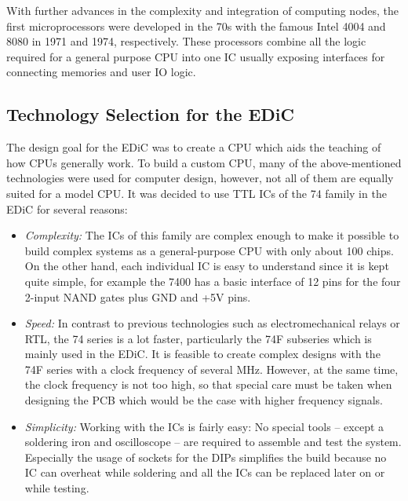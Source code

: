 With further advances in the complexity and integration of computing nodes, the first microprocessors were developed in the 70s with the famous Intel 4004 and 8080 in 1971 and 1974, respectively.
These processors combine all the logic required for a general purpose \gls{CPU} into one \gls{IC} usually exposing interfaces for connecting memories and user \gls{IO} logic.

\subsection{Technology Selection for the \gls{EDiC}}
The design goal for the \gls{EDiC} was to create a \gls{CPU} which aids the teaching of how \glspl{CPU} generally work.
To build a custom \gls{CPU}, many of the above-mentioned technologies were used for computer design, however, not all of them are equally suited for a model \gls{CPU}.
It was decided to use \gls{TTL} \glspl{IC} of the 74 family in the \gls{EDiC} for several reasons:
\begin{itemize}
  \item \emph{Complexity:} The \glspl{IC} of this family are complex enough to make it possible to build complex systems as a general-purpose \gls{CPU} with only about 100 chips.
  On the other hand, each individual \gls{IC} is easy to understand since it is kept quite simple, for example the 7400 has a basic interface of 12 pins for the four 2-input NAND gates plus GND and +5V pins.

  \item \emph{Speed:} In contrast to previous technologies such as electromechanical relays or \gls{RTL}, the 74 series is a lot faster, particularly the 74F subseries which is mainly used in the \gls{EDiC}.
  It is feasible to create complex designs with the 74F series with a clock frequency of several \unit{\mega\hertz}.
  However, at the same time, the clock frequency is not too high, so that special care must be taken when designing the \gls{PCB} which would be the case with higher frequency signals.

  \item \emph{Simplicity:} Working with the \glspl{IC} is fairly easy: No special tools -- except a soldering iron and oscilloscope -- are required to assemble and test the system.
  Especially the usage of sockets for the \glspl{DIP} simplifies the build because no \gls{IC} can overheat while soldering and all the \glspl{IC} can be replaced later on or while testing.
\end{itemize}

